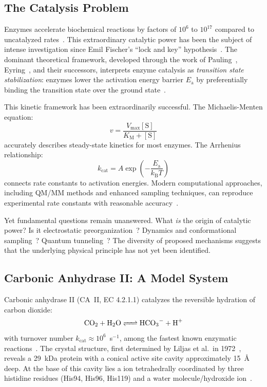 \documentclass[twocolumn,amsmath,amssymb,aps,prb,superscriptaddress,longbibliography]{revtex4-2}
\newcommand{\kcat}{k_{\mathrm{cat}}}
\newcommand{\kB}{k_{\mathrm{B}}}
\newcommand{\Km}{K_{\mathrm{M}}}
\newcommand{\Vmax}{V_{\mathrm{max}}}
\newcommand{\Ea}{E_{\mathrm{a}}}
\begin{document}
\subsection{The Catalysis Problem}

Enzymes accelerate biochemical reactions by factors of $10^{6}$ to $10^{17}$ compared to uncatalyzed rates~\cite{Wolfenden1999}. This extraordinary catalytic power has been the subject of intense investigation since Emil Fischer's ``lock and key'' hypothesis~\cite{Fischer1894}. The dominant theoretical framework, developed through the work of Pauling~\cite{Pauling1946}, Eyring~\cite{Eyring1935}, and their successors, interprets enzyme catalysis as \emph{transition state stabilization}: enzymes lower the activation energy barrier $\Ea$ by preferentially binding the transition state over the ground state~\cite{Fersht1999}.

This kinetic framework has been extraordinarily successful. The Michaelis-Menten equation:
\begin{equation}
v = \frac{\Vmax [\text{S}]}{\Km + [\text{S}]}
\label{eq:michaelis-menten}
\end{equation}
accurately describes steady-state kinetics for most enzymes. The Arrhenius relationship:
\begin{equation}
\kcat = A \exp\left(-\frac{\Ea}{\kB T}\right)
\label{eq:arrhenius}
\end{equation}
connects rate constants to activation energies. Modern computational approaches, including QM/MM methods and enhanced sampling techniques, can reproduce experimental rate constants with reasonable accuracy~\cite{Warshel1998, Garcia-Viloca2004, Kamerlin2010}.

Yet fundamental questions remain unanswered. What \emph{is} the origin of catalytic power? Is it electrostatic preorganization~\cite{Warshel1998}? Dynamics and conformational sampling~\cite{Kamerlin2010, Kohen2015}? Quantum tunneling~\cite{Nagel2006}? The diversity of proposed mechanisms suggests that the underlying physical principle has not yet been identified.

\subsection{Carbonic Anhydrase II: A Model System}

Carbonic anhydrase II (CA~II, EC 4.2.1.1) catalyzes the reversible hydration of carbon dioxide:
\begin{equation}
\ce{CO2 + H2O <=> HCO3- + H+}
\label{eq:caii-reaction}
\end{equation}
with turnover number $\kcat \approx 10^6$~s$^{-1}$, among the fastest known enzymatic reactions~\cite{Lindskog1997, Krishnamurthy2008}. The crystal structure, first determined by Liljas et al.\ in 1972~\cite{Liljas1972}, reveals a 29~kDa protein with a conical active site cavity approximately 15~\AA{} deep. At the base of this cavity lies a  ion tetrahedrally coordinated by three histidine residues (His94, His96, His119) and a water molecule/hydroxide ion~\cite{Hakansson1992}.
\end{document}
